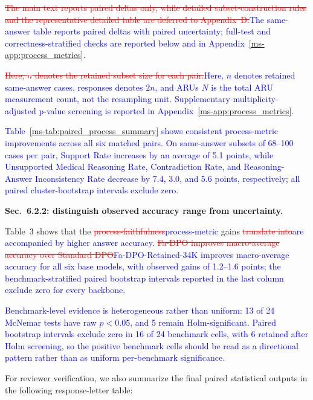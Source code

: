 \documentclass[12pt]{article}
\newcommand{\deleted}[1]{\textcolor{red}{\sout{#1}}}
\newcommand{\added}[1]{\textcolor{blue}{#1}}
\begin{document}
\begin{displayquote}
\deleted{The main text reports paired deltas only, while detailed subset-construction rules and the representative detailed table are deferred to Appendix~D.}\added{The same-answer table reports paired deltas with paired uncertainty; full-test and correctness-stratified checks are reported below and in Appendix~\ref*{ms-app:process_metrics}.}

\deleted{Here, $n$ denotes the retained subset size for each pair.}\added{Here, $n$ denotes retained same-answer cases, responses denotes $2n$, and ARUs $N$ is the total ARU measurement count, not the resampling unit. Supplementary multiplicity-adjusted p-value screening is reported in Appendix~\ref*{ms-app:process_metrics}.}

\added{Table~\ref*{ms-tab:paired_process_summary} shows consistent process-metric improvements across all six matched pairs. On same-answer subsets of 68--100 cases per pair, Support Rate increases by an average of 5.1 points, while Unsupported Medical Reasoning Rate, Contradiction Rate, and Reasoning-Answer Inconsistency Rate decrease by 7.4, 3.0, and 5.6 points, respectively; all paired cluster-bootstrap intervals exclude zero.}
\end{displayquote}

\textbf{Sec.~6.2.2: distinguish observed accuracy range from uncertainty.}

\begin{displayquote}
Table~3 shows that the \deleted{process-faithfulness}\added{process-metric} gains \deleted{translate into}\added{are accompanied by higher answer accuracy}. \deleted{Fa-DPO improves macro-average accuracy over Standard DPO}\added{Fa-DPO-Retained-34K improves macro-average accuracy for all six base models, with observed gains of 1.2--1.6 points; the benchmark-stratified paired bootstrap intervals reported in the last column exclude zero for every backbone.}

\added{Benchmark-level evidence is heterogeneous rather than uniform: 13 of 24 McNemar tests have raw $p<0.05$, and 5 remain Holm-significant. Paired bootstrap intervals exclude zero in 16 of 24 benchmark cells, with 6 retained after Holm screening, so the positive benchmark cells should be read as a directional pattern rather than as uniform per-benchmark significance.}
\end{displayquote}

\noindent For reviewer verification, we also summarize the final paired statistical outputs in the following response-letter table:
\end{document}
